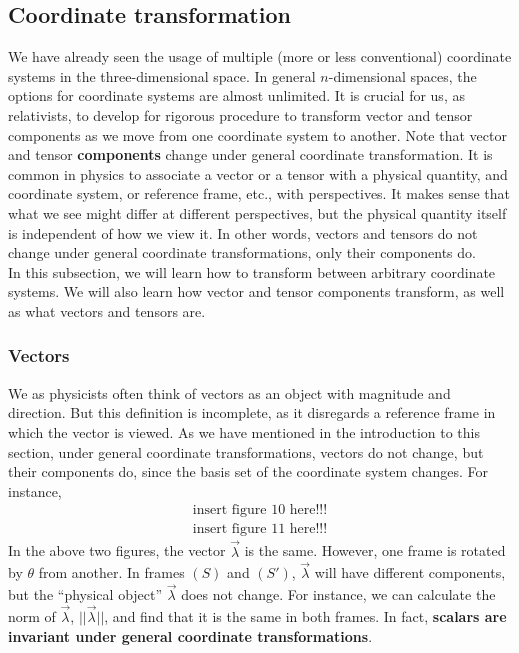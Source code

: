 \documentclass{article}
\theoremstyle{definition}
\begin{document}
\subsection{Coordinate transformation}
We have already seen the usage of multiple (more or less conventional) coordinate systems in the three-dimensional space. In general $n$-dimensional spaces, the options for coordinate systems are almost unlimited. It is crucial for us, as relativists, to develop for rigorous procedure to transform vector and tensor components as we move from one coordinate system to another. Note that vector and tensor \textbf{components} change under general coordinate transformation. It is common in physics to associate a vector or a tensor with a physical quantity, and coordinate system, or reference frame, etc., with perspectives. It makes sense that what we see might differ at different perspectives, but the physical quantity itself is independent of how we view it. In other words, vectors and tensors do not change under general coordinate transformations, only their components do.\\

In this subsection, we will learn how to transform between arbitrary coordinate systems. We will also learn how vector and tensor components transform, as well as what vectors and tensors are.
\subsubsection{Vectors}
We as physicists often think of vectors as an object with magnitude and direction. But this definition is incomplete, as it disregards a reference frame in which the vector is viewed. As we have mentioned in the introduction to this section, under general coordinate transformations, vectors do not change, but their components do, since the basis set of the coordinate system changes. For instance,
\begin{align*}
\text{insert figure 10 here!!!}
\end{align*}
\begin{align*}
\text{insert figure 11 here!!!}
\end{align*}
In the above two figures, the vector $\vec{\lambda}$ is the same. However, one frame is rotated by $\theta$ from another. In frames $(S)$ and $(S')$, $\vec{\lambda}$ will have different components, but the ``physical object'' $\vec{\lambda}$ does not change. For instance, we can calculate the norm of $\vec{\lambda}$, $\vert\vert \vec{\lambda} \vert\vert$, and find that it is the same in both frames. In fact, \textbf{scalars are invariant under general coordinate transformations}.\\
\end{document}
